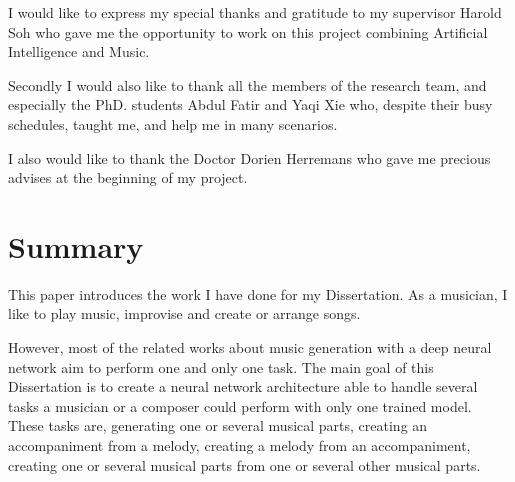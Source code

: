 \documentclass[12pt]{report}
\begin{document}
I would like to express my special thanks and gratitude to my supervisor Harold Soh who gave me the opportunity to work on this project combining Artificial Intelligence and Music.

Secondly I would also like to thank all the members of the research team, and especially the PhD. students Abdul Fatir and Yaqi Xie who, despite their busy schedules, taught me, and help me in many scenarios.

I also would like to thank the Doctor Dorien Herremans who gave me precious advises at the beginning of my project.

\newpage
\tableofcontents
\newpage


\setlength{\parindent}{0.6cm}


\chapter*{Summary}

This paper introduces the work I have done for my Dissertation.
As a musician, I like to play music, improvise and create or arrange songs.

However, most of the related works about music generation with a deep neural network aim to perform one and only one task.
The main goal of this Dissertation is to create a neural network architecture able to handle several tasks a musician or a composer could perform with only one trained model.
These tasks are, generating one or several musical parts, creating an accompaniment from a melody, creating a melody from an accompaniment, creating one or several musical parts from one or several other musical parts.
\end{document}
